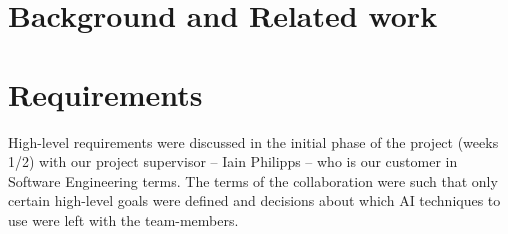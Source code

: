 \documentclass[11pt]{article}
\begin{document}
\section{Background and Related work}

\section{Requirements}
High-level requirements were discussed in the initial phase of the project 
(weeks 1/2) with our project supervisor -- Iain Philipps -- who is our customer
in Software Engineering terms. The terms of the collaboration were such that 
only certain high-level goals were defined and decisions about which AI techniques
to use were left with the team-members.

\begin{itemize}


\end{itemize}
\end{document}
